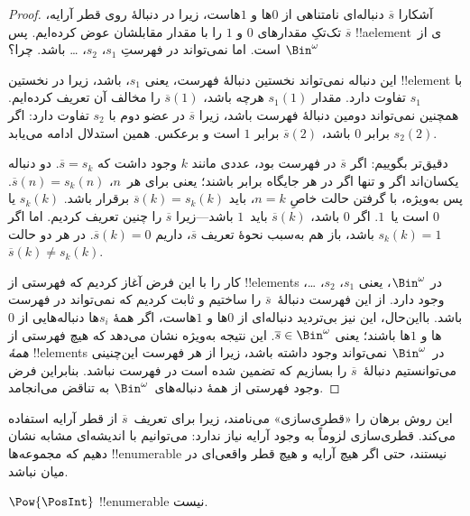 \documentclass[../../../include/open-logic-section]{subfiles}
\begin{document}
\begin{proof}
آشکارا $\overline{s}$ دنباله‌ای نامتناهی از $0$ها و $1$هاست، زیرا
در دنبالهٔ روی قطر آرایه، تک‌تکِ مقدارهای $0$ و $1$ را با مقدار مقابلشان
عوض کرده‌ایم. پس $\overline{s}$ !!a{element}ی از~$\Bin^\omega$ است.
اما نمی‌تواند در فهرستِ $s_1$، $s_2$، \dots{} باشد. چرا؟

این دنباله نمی‌تواند نخستین دنبالهٔ فهرست، یعنی $s_1$، باشد، زیرا در
نخستین !!{element} با $s_1$ تفاوت دارد. مقدار $s_1(1)$ هرچه باشد،
$\overline{s}(1)$ را مخالف آن تعریف کرده‌ایم. همچنین نمی‌تواند دومین
دنبالهٔ فهرست باشد، زیرا $\overline{s}$ در عضو دوم با $s_2$ تفاوت
دارد: اگر $s_2(2)$ برابر $0$ باشد، $\overline{s}(2)$ برابر $1$ است و
برعکس. همین استدلال ادامه می‌یابد.

دقیق‌تر بگوییم: اگر $\overline{s}$ در فهرست بود، عددی مانند $k$ وجود
داشت که $\overline{s} = s_{k}$. دو دنباله یکسان‌اند اگر و تنها اگر در
هر جایگاه برابر باشند؛ یعنی برای هر~$n$، $\overline{s}(n) =
s_{k}(n)$. پس به‌ویژه، با گرفتن حالت خاصِ $n = k$، باید
$\overline{s}(k) = s_{k}(k)$ برقرار باشد. $s_k(k)$ یا $0$ است یا~$1$.
اگر $0$ باشد، $\overline{s}(k)$ باید~$1$ باشد---زیرا $\overline{s}$
را چنین تعریف کردیم. اما اگر $s_k(k) = 1$ باشد، باز هم به‌سبب نحوهٔ
تعریف $\overline{s}$، داریم $\overline{s}(k) = 0$. در هر دو حالت
$\overline{s}(k) \neq s_{k}(k)$.

کار را با این فرض آغاز کردیم که فهرستی از !!{element}s در
$\Bin^\omega$، یعنی $s_1$، $s_2$، \dots{}، وجود دارد. از این فهرست
دنبالهٔ~$\overline{s}$ را ساختیم و ثابت کردیم که نمی‌تواند در فهرست
باشد. بااین‌حال، این نیز بی‌تردید دنباله‌ای از $0$ها و $1$هاست، اگر
همهٔ $s_i$ها دنباله‌هایی از $0$ها و $1$ها باشند؛ یعنی $\overline{s} \in
\Bin^\omega$. این نتیجه به‌ویژه نشان می‌دهد که هیچ
فهرستی از \emph{همهٔ} !!{element}s در~$\Bin^\omega$ نمی‌تواند وجود داشته
باشد، زیرا از هر فهرست این‌چنینی می‌توانستیم دنبالهٔ~$\overline{s}$ را
بسازیم که تضمین شده است در فهرست نباشد. بنابراین فرض وجود فهرستی از
همهٔ دنباله‌های~$\Bin^\omega$ به تناقض می‌انجامد.
\end{proof}

\begin{explain}
این روش برهان را «قطری‌سازی» می‌نامند، زیرا برای تعریف~$\overline{s}$
از قطر آرایه استفاده می‌کند. قطری‌سازی لزوماً به وجود آرایه نیاز
ندارد: می‌توانیم با اندیشه‌ای مشابه نشان دهیم که مجموعه‌ها
!!{enumerable} نیستند، حتی اگر هیچ آرایه و هیچ قطر واقعی‌ای در میان
نباشد.
\end{explain}

\begin{thm}
$\Pow{\PosInt}$ !!{enumerable} نیست.
\end{thm}
\end{document}
